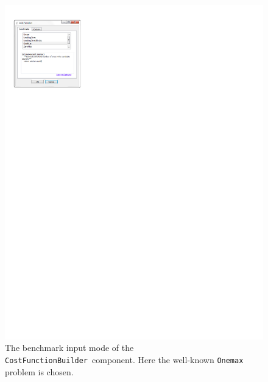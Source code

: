 \documentclass{sig-alternate}
\newcommand{\CostFunction}{\texttt{CostFunctionBuilder}}
\begin{document}
\begin{figure}
	\centering
	\includegraphics[scale=1.1]{onemax_costfun} 
	\caption{The benchmark input mode of the \CostFunction~component. Here the well-known \texttt{Onemax} problem is chosen.}
	\label{fig:onemax_costfun}
\end{figure}
\end{document}
